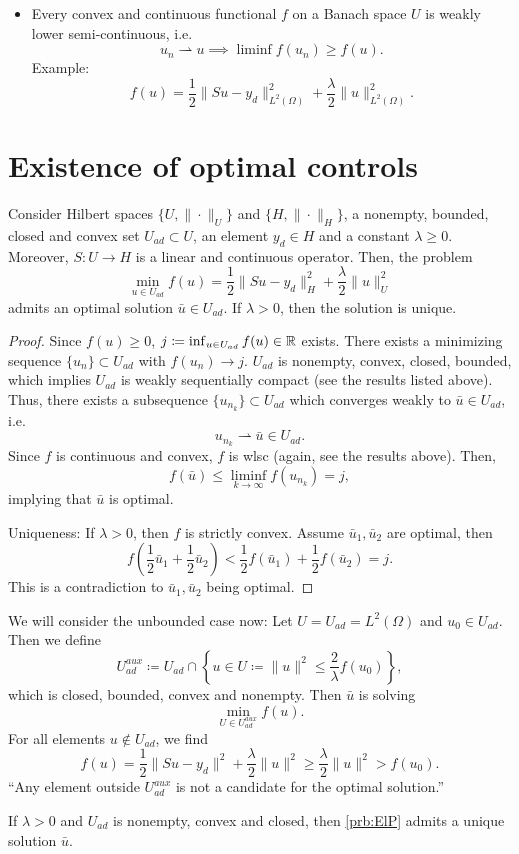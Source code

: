 \documentclass[../skript.tex]{subfiles}
\begin{document}
\begin{itemize}
\item Every convex and continuous functional $f$ on a Banach space $U$ is weakly lower semi-continuous, i.e.
\[
u_n \rightharpoonup u \implies \liminf f(u_n) \geq f(u).
\]
Example:
\[
	f(u) = \frac{1}{2} \| Su - y_d \|_{L^2(\Omega)}^2 + \frac{\lambda}{2} \| u \|_{L^2(\Omega)}^2.
\]
\end{itemize}
\section{Existence of optimal controls}
\begin{theorem}
Consider Hilbert spaces $\{ U, \| \cdot \|_U \}$ and $\{ H, \| \cdot \|_H \}$, a nonempty, bounded, closed and convex set $U_{ad} \subset U$, an element $y_d \in H$ and a constant $\lambda \geq 0$.
Moreover, $S : U \to H$ is a linear and continuous operator.
Then, the problem
\[
	\min_{u \in U_{ad}} f(u) = \frac{1}{2} \| Su - y_d \|^2_{H} + \frac{\lambda}{2} \| u \|_U^2
\]
admits an optimal solution $\bar{u} \in U_{ad}$. If $\lambda > 0$, then the solution is unique.
\end{theorem}
\begin{proof}
Since $f(u) \geq 0$, $j \coloneqq \inf_{u \in U_{ad}} f(u) \in \mathbb{R}$ exists.
There exists a minimizing sequence $\{ u_n \} \subset U_{ad}$ with $f(u_n) \to j$.
$U_{ad}$ is nonempty, convex, closed, bounded, which implies $U_{ad}$ is weakly sequentially compact (see the results listed above).
Thus, there exists a subsequence $\{ u_{n_k} \} \subset U_{ad}$ which converges weakly to $\bar{u} \in U_{ad}$, i.e.
\[
	u_{n_k} \rightharpoonup \bar{u} \in U_{ad}.
\]
Since $f$ is continuous and convex, $f$ is \ac{wlsc} (again, see the results above).
Then,
\[
	f(\bar{u}) \leq \liminf_{k \to \infty} f\left(u_{n_k}\right) = j,
\]
implying that $\bar{u}$ is optimal.

Uniqueness: If $\lambda > 0$, then $f$ is strictly convex. Assume $\bar{u}_1, \bar{u}_2$ are optimal, then
\[
	f\left( \frac{1}{2} \bar{u}_1 + \frac{1}{2} \bar{u}_2 \right) < \frac{1}{2} f\left(\bar{u}_1\right) + \frac{1}{2} f \left(\bar{u}_2\right) = j.
\]
This is a contradiction to $\bar{u}_1, \bar{u}_2$ being optimal.
\end{proof}
We will consider the unbounded case now:
Let $U = U_{ad} = L^2(\Omega)$ and $u_0 \in U_{ad}$.
Then we define
\[
	U_{ad}^{aux} \coloneqq U_{ad} \cap \left\{ u \in U \coloneqq \| u \|^2 \leq \frac{2}{\lambda} f(u_0) \right\},
\]
which is closed, bounded, convex and nonempty.
Then $\bar{u}$ is solving
\[
	\min_{U \in U_{ad}^{aux}} f(u).
\]
For all elements $u \notin U_{ad}$, we find
\[
	f(u) = \frac{1}{2} \| Su - y_d \| ^2 + \frac{\lambda}{2} \| u \|^2 \geq \frac{\lambda}{2} \| u \|^2 > f(u_0).
\] 
``Any element outside $U_{ad}^{aux}$ is not a candidate for the optimal solution.''
\begin{theorem}
If $\lambda > 0$ and $U_{ad}$ is nonempty, convex and closed, then \cref{prb:ElP} admits a unique solution $\bar{u}$.
\end{theorem}
\end{document}
